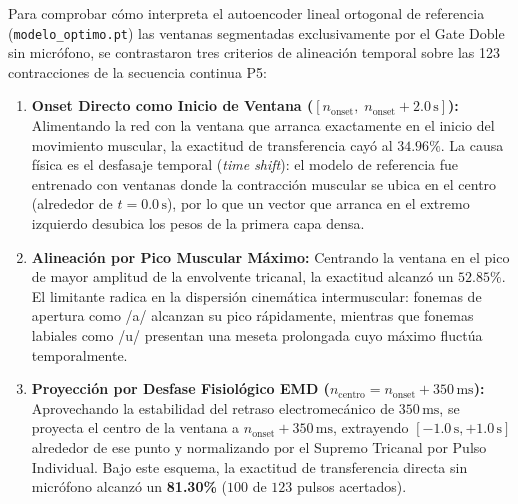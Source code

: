 \documentclass[11pt,a4paper,openany]{book}
\theoremstyle{definition}
\begin{document}
Para comprobar cómo interpreta el autoencoder lineal ortogonal de referencia (\texttt{modelo\_optimo.pt}) las ventanas segmentadas exclusivamente por el Gate Doble sin micrófono, se contrastaron tres criterios de alineación temporal sobre las 123 contracciones de la secuencia continua P5:
\begin{enumerate}
    \item \textbf{Onset Directo como Inicio de Ventana ($[n_{\text{onset}}, \; n_{\text{onset}} + 2.0\,\text{s}]$):}
    Alimentando la red con la ventana que arranca exactamente en el inicio del movimiento muscular, la exactitud de transferencia cayó al $34.96\%$. La causa física es el desfasaje temporal (\textit{time shift}): el modelo de referencia fue entrenado con ventanas donde la contracción muscular se ubica en el centro (alrededor de $t = 0.0\,\text{s}$), por lo que un vector que arranca en el extremo izquierdo desubica los pesos de la primera capa densa.
    \item \textbf{Alineación por Pico Muscular Máximo:}
    Centrando la ventana en el pico de mayor amplitud de la envolvente tricanal, la exactitud alcanzó un $52.85\%$. El limitante radica en la dispersión cinemática intermuscular: fonemas de apertura como /a/ alcanzan su pico rápidamente, mientras que fonemas labiales como /u/ presentan una meseta prolongada cuyo máximo fluctúa temporalmente.
    \item \textbf{Proyección por Desfase Fisiológico EMD ($n_{\text{centro}} = n_{\text{onset}} + 350\,\text{ms}$):}
    Aprovechando la estabilidad del retraso electromecánico de $350\,\text{ms}$, se proyecta el centro de la ventana a $n_{\text{onset}} + 350\,\text{ms}$, extrayendo $[-1.0\,\text{s}, +1.0\,\text{s}]$ alrededor de ese punto y normalizando por el Supremo Tricanal por Pulso Individual. Bajo este esquema, la exactitud de transferencia directa sin micrófono alcanzó un \textbf{81.30\%} ($100$ de $123$ pulsos acertados).
\end{enumerate}
\end{document}
